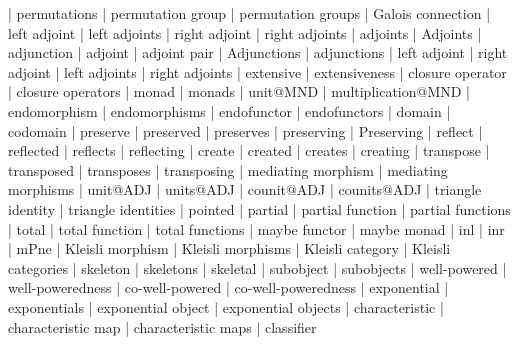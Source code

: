     |   permutations
    |   permutation group
    |   permutation groups
    |   Galois connection
    |   left adjoint
    |   left adjoints
    |   right adjoint
    |   right adjoints
    |   adjoints
    |   Adjoints
    |   adjunction
    |   adjoint
    |   adjoint pair
    |   Adjunctions
    |   adjunctions
    |   left adjoint
    |   right adjoint
    |   left adjoints
    |   right adjoints
    |   extensive
    |   extensiveness
    |   closure operator
    |   closure operators
    |   monad
    |   monads
    |   unit@MND
    |   multiplication@MND
    |   endomorphism
    |   endomorphisms
    |   endofunctor
    |   endofunctors
    |   domain
    |   codomain
    |   preserve
    |   preserved
    |   preserves
    |   preserving
    |   Preserving
    |   reflect
    |   reflected
    |   reflects
    |   reflecting
    |   create
    |   created
    |   creates
    |   creating
    |   transpose
    |   transposed
    |   transposes
    |   transposing
    |   mediating morphism
    |   mediating morphisms
    |   unit@ADJ
    |   units@ADJ  
    |   counit@ADJ
    |   counits@ADJ
    |   triangle identity
    |   triangle identities
    |   pointed
    |   partial
    |   partial function
    |   partial functions
    |   total
    |   total function
    |   total functions
    |   maybe functor
    |   maybe monad
    |   inl
    |   inr
    |   mPne
    |   Kleisli morphism
    |   Kleisli morphisms
    |   Kleisli category
    |   Kleisli categories
    |   skeleton
    |   skeletons
    |   skeletal
    |   subobject
    |   subobjects
    |   well-powered
    |   well-poweredness
    |   co-well-powered
    |   co-well-poweredness
    |   exponential
    |   exponentials
    |   exponential object
    |   exponential objects
    |   characteristic
    |   characteristic map
    |   characteristic maps
    |   classifier
